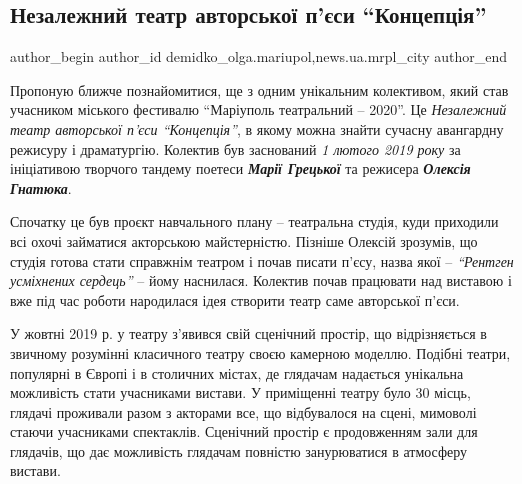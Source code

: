  
 
 
 
 
 
\subsection{Незалежний театр авторської п'єси \enquote{Концепція}}
\label{sec:10_11_2020.stz.news.ua.mrpl_city.1.nezalezhnyj_teatr_avtorskoj_pjesy_koncepcia}
 
\ifcmt
 author_begin
   author_id demidko_olga.mariupol,news.ua.mrpl_city
 author_end
\fi

Пропоную ближче познайомитися, ще з одним унікальним колективом, який став
учасником міського фестивалю \enquote{Маріуполь театральний – 2020}. Це \emph{Незалежний
театр авторської п'єси \enquote{Концепція}}, в якому можна знайти сучасну авангардну
режисуру і драматургію. Колектив був заснований \emph{1 лютого 2019 року} за
ініціативою творчого тандему поетеси \emph{\textbf{Марії Грецької}} та режисера \emph{\textbf{Олексія
Гнатюка}}.


Спочатку це був проєкт навчального плану – театральна студія, куди
приходили всі охочі займатися акторською майстерністю. Пізніше Олексій
зрозумів, що студія готова стати справжнім театром і почав писати п'єсу, назва
якої – \emph{\enquote{Рентген усміхнених сердець}} – йому наснилася. Колектив почав працювати
над виставою і вже під час роботи народилася ідея створити театр саме
авторської п'єси.

У жовтні 2019 р. у театру з'явився свій сценічний простір, що відрізняється в
звичному розумінні класичного театру своєю камерною моделлю. Подібні театри,
популярні в Європі і в столичних містах, де глядачам надається унікальна
можливість стати учасниками вистави. У приміщенні театру було 30 місць, глядачі
проживали разом з акторами все, що відбувалося на сцені, мимоволі стаючи
учасниками спектаклів. Сценічний простір є продовженням зали для глядачів, що
дає можливість глядачам повністю занурюватися в атмосферу вистави.

